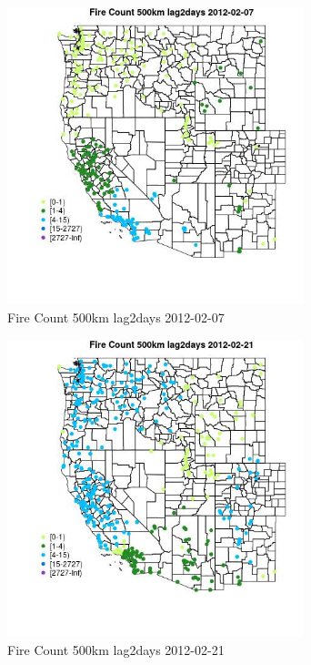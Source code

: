 \begin{figure} 
\centering  
\includegraphics[width=0.77\textwidth]{Code_Outputs/Report_ML_input_PM25_Step4_part_f_de_duplicated_aves_prioritize_24hr_obswNAs_MapObsFire_Count_500km_lag2days2012-02-07.jpg} 
\caption{\label{fig:Report_ML_input_PM25_Step4_part_f_de_duplicated_aves_prioritize_24hr_obswNAsMapObsFire_Count_500km_lag2days2012-02-07}Fire Count 500km lag2days 2012-02-07} 
\end{figure} 
 

\begin{figure} 
\centering  
\includegraphics[width=0.77\textwidth]{Code_Outputs/Report_ML_input_PM25_Step4_part_f_de_duplicated_aves_prioritize_24hr_obswNAs_MapObsFire_Count_500km_lag2days2012-02-21.jpg} 
\caption{\label{fig:Report_ML_input_PM25_Step4_part_f_de_duplicated_aves_prioritize_24hr_obswNAsMapObsFire_Count_500km_lag2days2012-02-21}Fire Count 500km lag2days 2012-02-21} 
\end{figure} 
 


